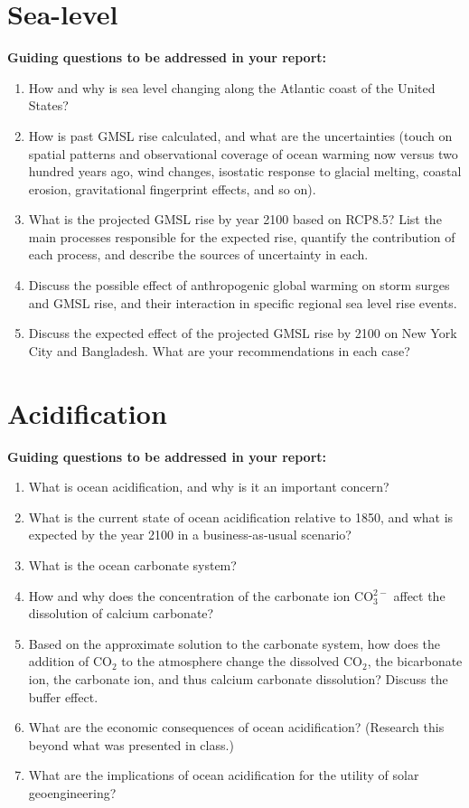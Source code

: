 \documentclass[12pt]{article}
\begin{document}
\section*{Sea-level}
  \textbf{Guiding questions to be addressed in your report:}
    \begin{enumerate}
    \item How and why is sea level changing along the Atlantic coast of the United States?
    \item How is past GMSL rise calculated, and what are the uncertainties (touch on spatial patterns and observational coverage of ocean warming now versus two hundred years ago, wind changes, isostatic response to glacial melting, coastal erosion, gravitational fingerprint effects, and so on).
    \item What is the projected GMSL rise by year 2100 based on RCP8.5? List the main processes responsible for the expected rise, quantify the contribution of each process, and describe the sources of uncertainty in each.
    \item Discuss the possible effect of anthropogenic global warming on storm surges and GMSL rise, and their interaction in specific regional sea level rise events.
    \item Discuss the expected effect of the projected GMSL rise by 2100 on New York City and Bangladesh. What are your recommendations in each case?
    \end{enumerate}

\section*{Acidification}
  \textbf{Guiding questions to be addressed in your report:}
    \begin{enumerate}
    \item What is ocean acidification, and why is it an important concern?
    \item What is the current state of ocean acidification relative to 1850, and what is expected by the year 2100 in a business-as-usual scenario?
    \item What is the ocean carbonate system?
    \item How and why does the concentration of the carbonate ion CO$_3^{2-}$ affect the dissolution of calcium carbonate?
    \item Based on the approximate solution to the carbonate system, how does the addition of CO$_2$ to the atmosphere change the dissolved CO$_2$, the bicarbonate ion, the carbonate ion, and thus calcium carbonate dissolution? Discuss the buffer effect.
    \item What are the economic consequences of ocean acidification? (Research this beyond what was presented in class.)
    \item What are the implications of ocean acidification for the utility of solar geoengineering?
    \end{enumerate}
\end{document}
